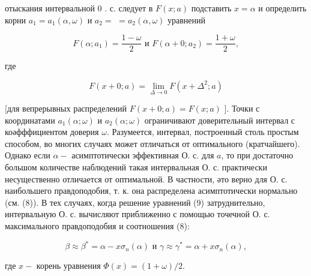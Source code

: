 \documentclass[10pt]{article}
\begin{document}
отыскания интервальной 0 . с. следует в $F(x ; a)$ подставить $x=\alpha$ и определить корни $a_{1}=a_{1}(\alpha, \omega)$ и $a_{2}=$ $=a_{2}(\alpha, \omega)$ уравнений



\[

F\left(\alpha ; a_{1}\right)=\frac{1-\omega}{2} \text { и } F\left(\alpha+0 ; a_{2}\right)=\frac{1+\omega}{2},

\]



где



\[

F(x+0 ; a)=\lim _{\Delta \rightarrow 0} F\left(x+\Delta^{2} ; a\right)

\]



[для вепрерывных распределений $F(x+0 ; a)=F(x ; a)$ ]. Точки с координатами $a_{1}(\alpha ; \omega)$ и $a_{2}(\alpha ; \omega)$ ограничивают доверительный интервал с коәфффициентом доверия $\omega$. Разумеется, интервал, построенный столь простым способом, во многих случаях может отличаться от оптимального (кратчайшего). Однако если $\alpha-$ асимптотически эффективная О. с. для $a$, то при достаточно большом количестве наблюдений такая интервальная О. с. практически несущественно отличается от оптимальной. В частности, әто верно для О. с. наибольшего правдоподобия, т. к. она распределена асимптотически нормально (см. (8)). В тех случаях, когда решение уравнений (9) затруднительно, интервальную О. с. вычисляют приближенно с помощью точечной О. с. максимального правдоподобия и соотношения (8):



\[

\beta \approx \beta^{*}=\alpha-x \sigma_{n}(\alpha) \text { и } \gamma \approx \gamma^{*}=\alpha+x \sigma_{n}(\alpha),

\]



где $x-$ корень уравнения $\Phi(x)=(1+\omega) / 2$.
\end{document}
